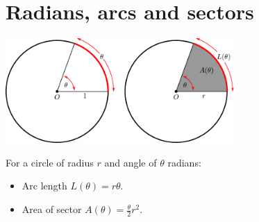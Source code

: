 \section{Radians, arcs and sectors}\label{app rad arc sec}
\begin{center}
 \includegraphics[height=4cm]{radian}
\end{center}
For a circle of radius $r$ and angle of $\theta$ radians:
\begin{itemize}
 \item Arc length $L(\theta) = r \theta$.
 \item Area of sector $A(\theta) = \frac{\theta}{2} r^2$.
\end{itemize}



